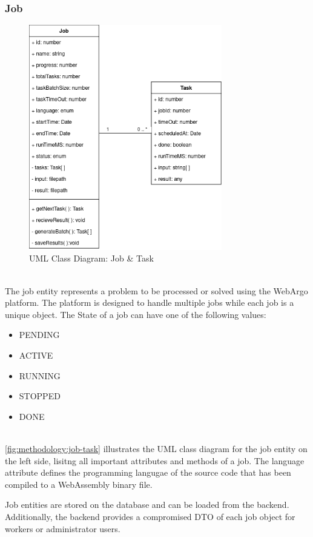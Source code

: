 \subsubsection{Job}
\begin{figure}[htbp]
    \centering
    \includegraphics[width=0.75\textwidth]{gfx/figures/Job-Task.png}
    \caption{\acs{UML} Class Diagram: Job \& Task}
    \label{fig:methodology:job-task}
\end{figure}
~\\
The job entity represents a problem to be processed or solved using the WebArgo platform. The platform is designed to handle multiple jobs while each job is a unique object. The State of a job can have one of the following values:
\begin{itemize}
  \item PENDING
  \item ACTIVE
  \item RUNNING
  \item STOPPED
  \item DONE
\end{itemize}
~\\
\autoref{fig:methodology:job-task} illustrates the \ac{UML} class diagram for the job entity on the left side, lisitng all important attributes and methods of a job. The language attribute defines the programming langugae of the source code that has been compiled to a WebAssembly binary file.

Job entities are stored on the database and can be loaded from the backend. Additionally, the backend provides a compromised \ac{DTO} of each job object for workers or administrator users. 


